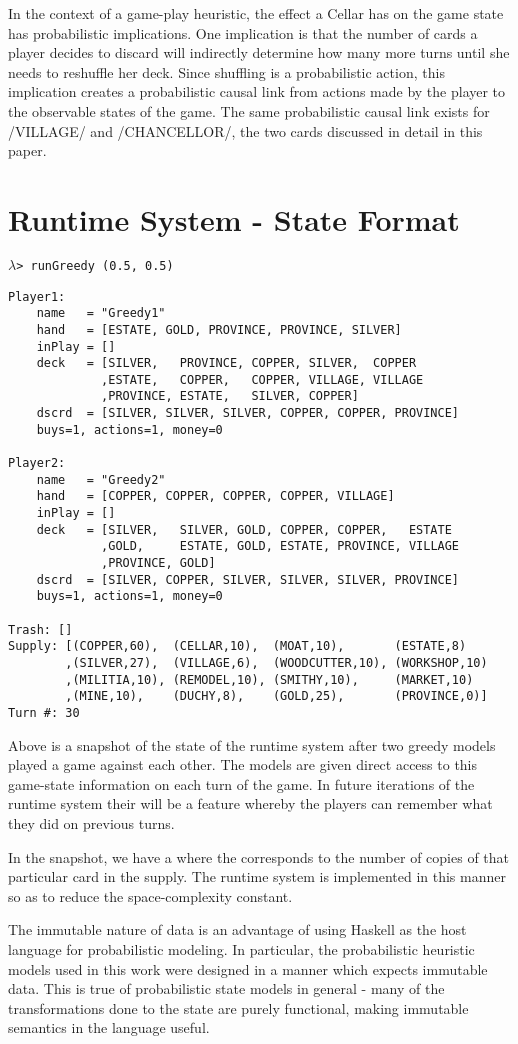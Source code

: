 In the context of a game-play heuristic, the effect a Cellar has on the game state
has probabilistic implications. One implication is that the number of cards a
player decides to discard will indirectly determine how many more turns until
she needs to reshuffle her deck. Since shuffling is a probabilistic action, this
implication creates a probabilistic causal link from actions made by the player
to the observable states of the game.
The same probabilistic causal link exists for \hsk/VILLAGE/ and \hsk/CHANCELLOR/,
the two cards discussed in detail in this paper.

\section{Runtime System - State Format} \label{appendix:dominion-state-format}
\begin{small}
$\lambda$\verb|> runGreedy (0.5, 0.5)|
\end{small}
\begin{Verbatim}[fontsize=\small]
Player1:
    name   = "Greedy1"
    hand   = [ESTATE, GOLD, PROVINCE, PROVINCE, SILVER]
    inPlay = []
    deck   = [SILVER,   PROVINCE, COPPER, SILVER,  COPPER
             ,ESTATE,   COPPER,   COPPER, VILLAGE, VILLAGE
             ,PROVINCE, ESTATE,   SILVER, COPPER]
    dscrd  = [SILVER, SILVER, SILVER, COPPER, COPPER, PROVINCE]
    buys=1, actions=1, money=0

Player2:
    name   = "Greedy2"
    hand   = [COPPER, COPPER, COPPER, COPPER, VILLAGE]
    inPlay = []
    deck   = [SILVER,   SILVER, GOLD, COPPER, COPPER,   ESTATE
             ,GOLD,     ESTATE, GOLD, ESTATE, PROVINCE, VILLAGE
             ,PROVINCE, GOLD]
    dscrd  = [SILVER, COPPER, SILVER, SILVER, SILVER, PROVINCE]
    buys=1, actions=1, money=0

Trash: []
Supply: [(COPPER,60),  (CELLAR,10),  (MOAT,10),       (ESTATE,8)
        ,(SILVER,27),  (VILLAGE,6),  (WOODCUTTER,10), (WORKSHOP,10)
        ,(MILITIA,10), (REMODEL,10), (SMITHY,10),     (MARKET,10)
        ,(MINE,10),    (DUCHY,8),    (GOLD,25),       (PROVINCE,0)]
Turn #: 30
\end{Verbatim}

Above is a snapshot of the state of the runtime system after two
greedy models played a game against each other.
The models are given direct access to this game-state information
on each turn of the game. In future iterations of the runtime system
their will be a feature whereby the players can remember what
they did on previous turns.

In the snapshot, we have a  where
the  corresponds to the number of copies of
that particular card in the supply. The runtime system is implemented in
this manner so as to reduce the space-complexity constant.

The immutable nature of data is an advantage of using Haskell as the
host language for probabilistic modeling. In particular, the probabilistic
heuristic models used in this work were designed in a manner which expects
immutable data. This is true of probabilistic state models in general - many
of the transformations done to the state are purely functional, making
immutable semantics in the language useful.

